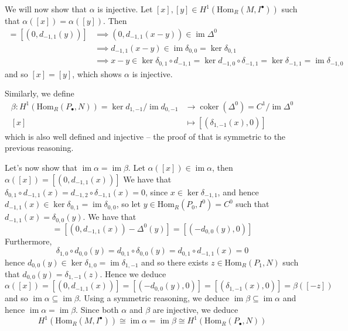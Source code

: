 \documentclass{article}
\newcommand{\Hom}[2]{\mathrm{Hom}_R(#1, #2)}
\DeclareMathOperator{\im}{im}
\DeclareMathOperator{\coker}{coker}
\begin{document}
We will now show that $\alpha$ is injective. Let $[x], [y]
\in H^1(\Hom{M}{I^\bullet})$ such that
$\alpha([x]) = \alpha([y])$. Then
\begin{align*}
	[(0, d_{-1, 1}(x))] = [(0, d_{-1, 1}(y))]
	&\implies (0, d_{-1, 1}(x - y)) \in \im \Delta^0\\
	&\implies d_{-1, 1}(x - y) \in \im \delta_{0, 0}
	= \ker \delta_{0, 1}\\
	&\implies x - y \in \ker \delta_{0, 1} \circ d_{-1, 1}
	= \ker d_{-1, 0} \circ \delta_{-1, 1} 
	= \ker \delta_{-1, 1} = \im \delta_{-1, 0}
\end{align*}
and so $[x] = [y]$, which shows $\alpha$ is injective.

Similarly, we define
\begin{align*}
	\beta: H^1(\Hom{P_\bullet}{N}) =
	\ker d_{1, -1}/\im d_{0,-1} &\to \coker(\Delta^0)
	= C^1/\im \Delta^0\\
	[x] &\mapsto [(\delta_{1, -1}(x), 0)]
\end{align*}
which is also well defined and injective -- the proof of that is
symmetric to the previous reasoning.

Let's now show that $\im \alpha = \im \beta$.
Let $\alpha([x]) \in \im \alpha$, then $\alpha([x])
= [(0, d_{-1, 1}(x))]$
We have that $\delta_{0, 1} \circ d_{-1, 1}(x)
= d_{-1, 2}\circ \delta_{-1, 1}(x) = 0$, since
$x \in \ker \delta_{-1, 1}$, and hence $d_{-1, 1}(x) \in 
\ker \delta_{0, 1} = \im \delta_{0, 0}$, so let $y \in 
\Hom{P_0}{I^0} = C^0$ such that $d_{-1, 1}(x) = \delta_{0, 0}(y)$.
We have that
\begin{equation*}
	[(0, d_{-1, 1}(x))] =
	[(0, d_{-1, 1}(x)) - \Delta^0(y)] =
	[(-d_{0, 0}(y), 0)]
\end{equation*}
Furthermore,
\begin{equation*}
	\delta_{1, 0}\circ d_{0, 0}(y) = d_{0, 1} \circ \delta_{0,0}(y)
	= d_{0, 1} \circ d_{-1, 1}(x) = 0
\end{equation*}
hence $d_{0, 0}(y) \in \ker \delta_{1, 0} = \im \delta_{1, -1}$
and so there exists $z \in \Hom{P_1}{N}$ such that
$d_{0, 0}(y) = \delta_{1, -1}(z)$.
Hence we deduce
\begin{equation*}
	\alpha([x]) = [(0, d_{-1, 1}(x))] = 
	[(-d_{0, 0}(y), 0)] = [(\delta_{1, -1}(x), 0)]
	= \beta([-z])
\end{equation*}
and so $\im \alpha \subseteq \im \beta$.
Using a symmetric reasoning, we deduce
$\im \beta \subseteq \im \alpha$ and hence
$\im \alpha = \im \beta$.
Since both $\alpha$ and $\beta$ are injective, we deduce
\begin{equation*}
	H^1(\Hom{M}{I^\bullet}) \cong \im \alpha = \im \beta
	\cong H^1(\Hom{P_{\bullet}}{N})
\end{equation*}
\end{document}
